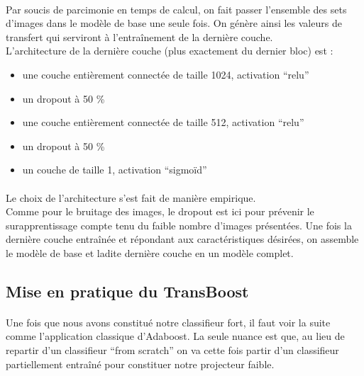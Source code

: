 \documentclass[11 pt]{article}
\begin{document}
\paragraph{}Par soucis de parcimonie en temps de calcul, on fait passer l’ensemble des sets d’images dans le modèle de base une seule fois. On génère ainsi les valeurs de transfert qui serviront à l’entraînement de la dernière couche. \\
L’architecture de la dernière couche (plus exactement du dernier bloc) est :\\ \medskip
\begin{samepage}
  \begin{itemize}
    \item une couche entièrement connectée de taille 1024, activation “relu”
    \nopagebreak
    \item un dropout à 50 \%
    \nopagebreak
    \item une couche entièrement connectée de taille 512, activation “relu”
    \nopagebreak
    \item un dropout à 50 \%
    \nopagebreak
    \item un couche de taille 1, activation “sigmoïd”
  \end{itemize}
\end{samepage}

\medskip

\paragraph{}Le choix de l'architecture s’est fait de manière empirique.\\

Comme pour le bruitage des images, le dropout est ici pour prévenir le surapprentissage compte tenu du faible nombre d’images présentées.
Une fois la dernière couche entraînée et répondant aux caractéristiques désirées, on assemble le modèle de base et ladite dernière couche en un modèle complet.


\subsection{Mise en pratique du TransBoost}
\paragraph{}Une fois que nous avons constitué notre classifieur fort, il faut voir la suite comme l’application classique d’Adaboost. La seule nuance est que, au lieu de repartir d’un classifieur “from scratch” on va cette fois partir d’un classifieur partiellement entraîné pour constituer notre projecteur faible.
\end{document}
